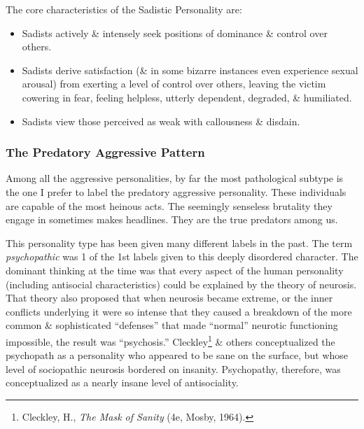 \documentclass{article}
\numberwithin{equation}{section}
\begin{document}
The core characteristics of the Sadistic Personality are:
\begin{itemize}
	\item Sadists actively \& intensely seek positions of dominance \& control over others.
	\item Sadists derive satisfaction (\& in some bizarre instances even experience sexual arousal) from exerting a level of control over others, leaving the victim cowering in fear, feeling helpless, utterly dependent, degraded, \& humiliated.
	\item Sadists view those perceived as weak with callousness \& disdain.
\end{itemize}

\subsubsection{The Predatory Aggressive Pattern}
Among all the aggressive personalities, by far the most pathological subtype is the one I prefer to label the predatory aggressive personality. These individuals are capable of the most heinous acts. The seemingly senseless brutality they engage in sometimes makes headlines. They are the true predators among us.

This personality type has been given many different labels in the past. The term \textit{psychopathic} was 1 of the 1st labels given to this deeply disordered character. The dominant thinking at the time was that every aspect of the human personality (including antisocial characteristics) could be explained by the theory of neurosis. That theory also proposed that when neurosis became extreme, or the inner conflicts underlying it were so intense that they caused a breakdown of the more common \& sophisticated ``defenses'' that made ``normal'' neurotic functioning impossible, the result was ``psychosis.'' Cleckley\footnote{Cleckley, H., \textit{The Mask of Sanity} (4e, Mosby, 1964).} \& others conceptualized the psychopath as a personality who appeared to be sane on the surface, but whose level of sociopathic neurosis bordered on insanity. Psychopathy, therefore, was conceptualized as a nearly insane level of antisociality.
\end{document}
